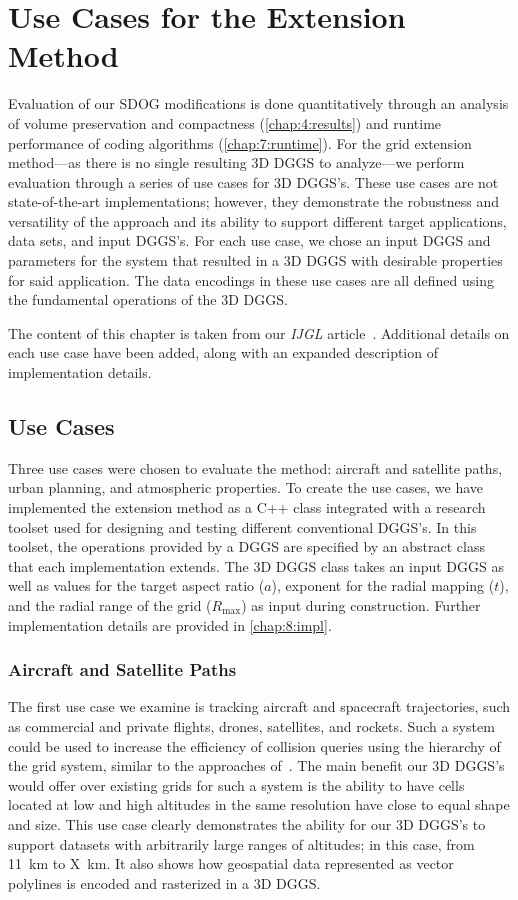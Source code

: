 \chapter{Use Cases for the Extension Method} \label{chap:usecases}
Evaluation of our SDOG modifications is done quantitatively through an analysis of volume preservation and compactness (\cref{chap:4:results}) and runtime performance of coding algorithms (\cref{chap:7:runtime}).
For the grid extension method---as there is no single resulting 3D DGGS to analyze---we perform evaluation through a series of use cases for 3D DGGS's.
These use cases are not state-of-the-art implementations; however, they demonstrate the robustness and versatility of the approach and its ability to support different target applications, data sets, and input DGGS's.
For each use case, we chose an input DGGS and parameters for the system that resulted in a 3D DGGS with desirable properties for said application.
The data encodings in these use cases are all defined using the fundamental operations of the 3D DGGS.


The content of this chapter is taken from our \textit{IJGL} article~\cite{ulmer2020general}.
Additional details on each use case have been added, along with an expanded description of implementation details.


\section{Use Cases}
Three use cases were chosen to evaluate the method: aircraft and satellite paths, urban planning, and atmospheric properties.
To create the use cases, we have implemented the extension method as a C++ class integrated with a research toolset used for designing and testing different conventional DGGS's.
In this toolset, the operations provided by a DGGS are specified by an abstract class that each implementation extends.
The 3D DGGS class takes an input DGGS as well as values for the target aspect ratio ($a$), exponent for the radial mapping ($t$), and the radial range of the grid ($R_\mathrm{max}$) as input during construction.
Further implementation details are provided in \cref{chap:8:impl}.


\subsection{Aircraft and Satellite Paths} \label{chap:8:sats}
The first use case we examine is tracking aircraft and spacecraft trajectories, such as commercial and private flights, drones, satellites, and rockets.
Such a system could be used to increase the efficiency of collision queries using the hierarchy of the grid system, similar to the approaches of~\cite{miao2019low, zhai2019collision}.
The main benefit our 3D DGGS's would offer over existing grids for such a system is the ability to have cells located at low and high altitudes in the same resolution have close to equal shape and size.
This use case clearly demonstrates the ability for our 3D DGGS's to support datasets with arbitrarily large ranges of altitudes; in this case, from 11~km to X~km.
It also shows how geospatial data represented as vector polylines is encoded and rasterized in a 3D DGGS.


